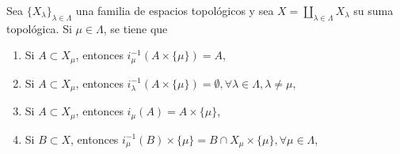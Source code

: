 
\begin{proposition}
Sea $\{ X_{\lambda} \}_{\lambda \in \Lambda}$ una familia de espacios topológicos y sea $X = \coprod_{\lambda \in \Lambda} X_{\lambda}$ su suma topológica. Si $\mu \in \Lambda$, se tiene que
\begin{enumerate}[label=\textnormal{(\roman*)}, align=left, labelwidth=1.7em, leftmargin=3.0em]
\item Si $A \subset X_{\mu}$, entonces $i^{-1}_{\mu}(A \times \{ \mu \}) = A$,
\item Si $A \subset X_{\mu}$, entonces $i^{-1}_{\lambda}(A \times \{ \mu \}) = \emptyset, \forall \lambda \in \Lambda, \lambda \ne \mu$,
\item Si $A \subset X_{\mu}$, entonces $i_{\mu}(A) = A \times \{ \mu \}$,
\item Si $B \subset X$, entonces $i^{-1}_{\mu}(B) \times \{ \mu \} = B \cap X_{\mu} \times \{ \mu \}, \forall \mu \in \Lambda$,
\end{enumerate}
\end{proposition}


